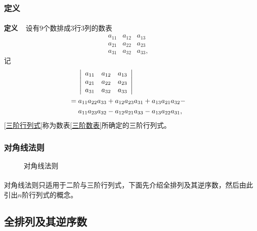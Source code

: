 \subsubsection{定义}
\paragraph{}
\textbf{定义~~}设有$9$个数排成$3$行$3$列的数表
\begin{equation}
  \label{三阶数表}
  \begin{array}{lll}
    a_{11} & a_{12} & a_{13} \\
    a_{21} & a_{22} & a_{23} \\
    a_{31} & a_{32} & a_{33},
  \end{array}
\end{equation}
记
\begin{align}
\centering
  \begin{split}
    \label{三阶行列式}
    &\;\left|\begin{array}{lll}
      a_{11} & a_{12} & a_{13} \\
      a_{21} & a_{22} & a_{23} \\
      a_{31} & a_{32} & a_{33}
    \end{array}\right| \\
    =&\; a_{11}a_{22}a_{33} + a_{12}a_{23}a_{31} + a_{13}a_{21}a_{32} - \\
    &\; a_{11}a_{23}a_{32} - a_{12}a_{21}a_{33} - a_{13}a_{22}a_{31},
  \end{split}
\end{align}
\eqref{三阶行列式}称为数表\eqref{三阶数表}所确定的三阶行列式。

\subsubsection{对角线法则}
\begin{figure}[H]
\centering
  
  \caption{对角线法则}
  \label{图:三阶对角线法则}
\end{figure}

\paragraph{}
对角线法则只适用于二阶与三阶行列式，下面先介绍全排列及其逆序数，然后由此引出$n$阶行列式的概念。

\subsection{全排列及其逆序数}
